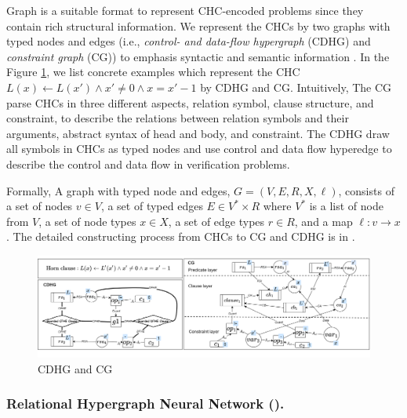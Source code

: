 Graph is a suitable format to represent CHC-encoded problems since they contain rich structural information.
%
We represent the CHCs by two graphs with typed nodes and edges (i.e., \emph{control- and data-flow hypergraph} (CDHG) and \emph{constraint graph} (CG)) to emphasis syntactic and semantic information \cite{HornGraph}.
%
In the Figure \ref{fig:CDHG-CG-examples}, we list concrete examples which represent the CHC $L(x)\leftarrow L(x') \wedge x'\neq 0 \wedge x=x'-1 $ by CDHG and CG.
%
Intuitively, The CG parse CHCs in three different aspects, relation symbol, clause structure, and constraint, to describe the relations between relation symbols and their arguments, abstract syntax of head and body, and constraint.
%
The CDHG draw all symbols in CHCs as typed nodes and use control and data flow hyperedge to describe the control and data flow in verification problems. 


Formally, A graph with typed node and edges, $G=(V,\mathit{E},R,X,\ell)$, consists of a set of nodes $v\in V$, a set of typed edges $\mathit{E} \in V^{*} \times R$ where $V^{*}$ is a list of node from $V$, a set of node types $x\in X$, a set of edge types $r\in R$, and a map $\ell: v\rightarrow x$.
%
The detailed constructing process from CHCs to CG and CDHG is in \cite{HornGraph}.


\begin{figure}[t]
\includegraphics[width=\textwidth]{figures/CDHG-CG-examples.png}
\caption{CDHG and CG} \label{fig:CDHG-CG-examples}
\end{figure}


\subsubsection{Relational Hypergraph Neural Network (\hyperedgeGNN).}


